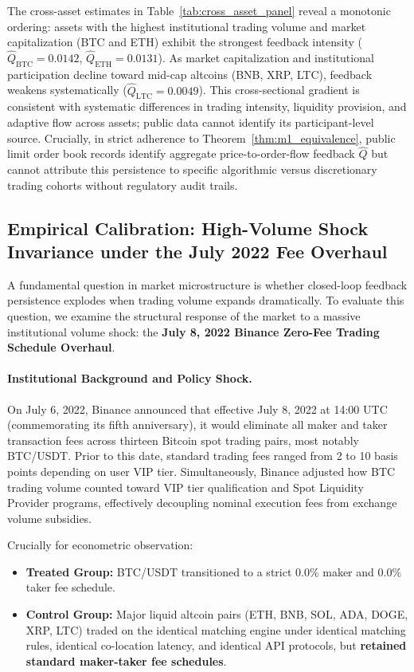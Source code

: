 \documentclass[12pt]{article}
\theoremstyle{definition}
\theoremstyle{remark}
\begin{document}
The cross-asset estimates in Table~\ref{tab:cross_asset_panel} reveal a monotonic ordering: assets with the highest institutional trading volume and market capitalization (BTC and ETH) exhibit the strongest feedback intensity ($\hat{Q}_{\text{BTC}} = 0.0142$, $\hat{Q}_{\text{ETH}} = 0.0131$). As market capitalization and institutional participation decline toward mid-cap altcoins (BNB, XRP, LTC), feedback weakens systematically ($\hat{Q}_{\text{LTC}} = 0.0049$). This cross-sectional gradient is consistent with systematic differences in trading intensity, liquidity provision, and adaptive flow across assets; public data cannot identify its participant-level source. Crucially, in strict adherence to Theorem~\ref{thm:m1_equivalence}, public limit order book records identify aggregate price-to-order-flow feedback $\hat{Q}$ but cannot attribute this persistence to specific algorithmic versus discretionary trading cohorts without regulatory audit trails.

\subsection{Empirical Calibration: High-Volume Shock Invariance under the July 2022 Fee Overhaul}
A fundamental question in market microstructure is whether closed-loop feedback persistence explodes when trading volume expands dramatically. To evaluate this question, we examine the structural response of the market to a massive institutional volume shock: the \textbf{July 8, 2022 Binance Zero-Fee Trading Schedule Overhaul}.

\paragraph{Institutional Background and Policy Shock.}
On July 6, 2022, Binance announced that effective July 8, 2022 at 14:00 UTC (commemorating its fifth anniversary), it would eliminate all maker and taker transaction fees across thirteen Bitcoin spot trading pairs, most notably BTC/USDT. Prior to this date, standard trading fees ranged from 2 to 10 basis points depending on user VIP tier. Simultaneously, Binance adjusted how BTC trading volume counted toward VIP tier qualification and Spot Liquidity Provider programs, effectively decoupling nominal execution fees from exchange volume subsidies.

Crucially for econometric observation:
\begin{itemize}
    \item \textbf{Treated Group:} BTC/USDT transitioned to a strict 0.0\% maker and 0.0\% taker fee schedule.
    \item \textbf{Control Group:} Major liquid altcoin pairs (ETH, BNB, SOL, ADA, DOGE, XRP, LTC) traded on the identical matching engine under identical matching rules, identical co-location latency, and identical API protocols, but \textbf{retained standard maker-taker fee schedules}.
\end{itemize}
\end{document}
